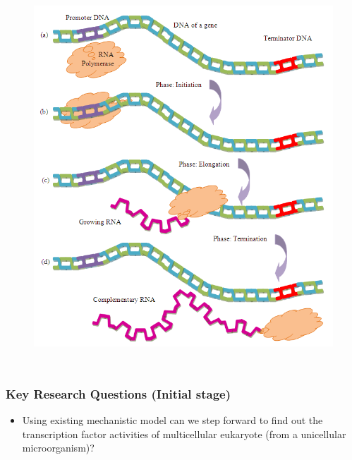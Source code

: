 \documentclass{beamer}
\begin{document}
\begin{frame}
\begin{columns}[c]
\begin{figure}[t]
\centering
\includegraphics[scale=.22]{diagrams/transcriptionProcess.png}
\label{fig:transcriptionProcess}
\end{figure}

\end{columns}
\end{frame}


\begin{frame}
\frametitle{Key Research Questions (Initial stage)}
\begin{itemize} 
\item Using existing mechanistic model can we step forward to find out the transcription factor activities of multicellular eukaryote (from a unicellular microorganism)? \\~\\


\end{itemize}
\end{frame}
\end{document}
